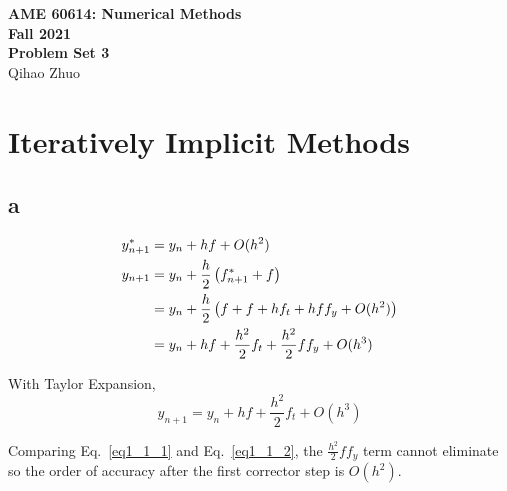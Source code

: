 \documentclass[letterpaper,10pt]{article}
\begin{document}
\fancyhf{}
\fancyfoot[C]{\thepage}

\thispagestyle{plain}
\begin{center}
  \large
  \textbf{AME 60614: Numerical Methods} \\
  \textbf{Fall 2021} \\
  \vspace{0.5em}
  \textbf{Problem Set 3} \\
  \vspace{1em}
  Qihao Zhuo
\end{center}

\vspace{1.5em}

\section{Iteratively Implicit Methods}\label{sec1}
\subsection{a}
\begin{align}
  y^*_{n+1}&=y_n+hf+O(h^2)\notag\\
  y_{n+1}&=y_n+\frac{h}{2}\left(f^*_{n+1}+f\right)\notag\\
  &=y_n+\frac{h}{2}\left(f+f+hf_t+hff_y+O(h^2)\right)\notag\\
  &=y_n+hf+\frac{h^2}{2}f_t+\frac{h^2}{2}ff_y+O(h^3)\label{eq1_1_1}
\end{align}

With Taylor Expansion, 
\begin{equation}
  y_{n+1}=y_n+hf+\frac{h^2}{2}f_t+O(h^3)\label{eq1_1_2}
\end{equation}

Comparing Eq.~\ref{eq1_1_1} and Eq.~\ref{eq1_1_2}, the $\frac{h^2}{2}ff_y$ term cannot eliminate so the order of accuracy after the first corrector step is $O(h^2)$. 
\end{document}
